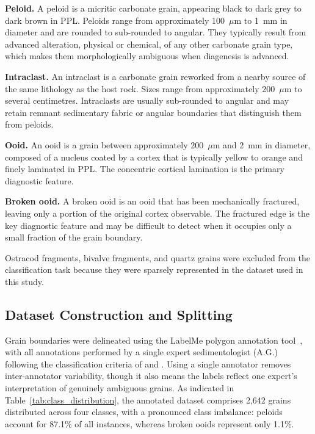 \documentclass[a4paper,fleqn]{cas-dc}
\begin{document}
\textbf{Peloid.} A peloid is a micritic carbonate grain, appearing black to dark grey to dark brown in PPL. Peloids range from approximately 100~$\mu$m to 1~mm in diameter and are rounded to sub-rounded to angular. They typically result from advanced alteration, physical or chemical, of any other carbonate grain type, which makes them morphologically ambiguous when diagenesis is advanced.

\textbf{Intraclast.} An intraclast is a carbonate grain reworked from a nearby source of the same lithology as the host rock. Sizes range from approximately 200~$\mu$m to several centimetres. Intraclasts are usually sub-rounded to angular and may retain remnant sedimentary fabric or angular boundaries that distinguish them from peloids.

\textbf{Ooid.} An ooid is a grain between approximately 200~$\mu$m and 2~mm in diameter, composed of a nucleus coated by a cortex that is typically yellow to orange and finely laminated in PPL. The concentric cortical lamination is the primary diagnostic feature.

\textbf{Broken ooid.} A broken ooid is an ooid that has been mechanically fractured, leaving only a portion of the original cortex observable. The fractured edge is the key diagnostic feature and may be difficult to detect when it occupies only a small fraction of the grain boundary.

Ostracod fragments, bivalve fragments, and quartz grains were excluded from the classification task because they were sparsely represented in the dataset used in this study.

\subsection{Dataset Construction and Splitting}


Grain boundaries were delineated using the LabelMe polygon annotation tool~\citep{labelme}, with all annotations performed by a single expert sedimentologist (A.G.) following the classification criteria of \citet{flugel2010} and \citet{scholle2003carbonate}. Using a single annotator removes inter-annotator variability, though it also means the labels reflect one expert's interpretation of genuinely ambiguous grains. As indicated in Table~\ref{tab:class_distribution}, the annotated dataset comprises 2,642 grains distributed across four classes, with a pronounced class imbalance: peloids account for 87.1\% of all instances, whereas broken ooids represent only 1.1\%.
\end{document}
